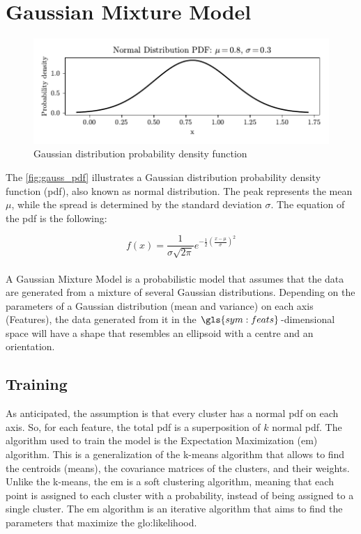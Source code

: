 \section{Gaussian Mixture Model}
\label{sec:gaussian}

\begin{figure}
    \centering
    \includegraphics{images/Gaussian/Figure_3.pdf}
    \caption{Gaussian distribution probability density function}
    \label{fig:gauss_pdf}
\end{figure}

The \autoref{fig:gauss_pdf} illustrates a Gaussian distribution probability density function (\gls{pdf}), also known as normal distribution. The peak represents the mean $\mu$, while the spread is determined by the standard deviation $\sigma$. The equation of the \gls{pdf} is the following:

$$
f(x) = \frac{1}{\sigma \sqrt{2\pi} } e^{-\frac{1}{2}\left(\frac{x-\mu}{\sigma}\right)^2}
$$

\paragraph*{}
A Gaussian Mixture Model is a probabilistic model that assumes that the data are generated from a mixture of several Gaussian distributions. Depending on the parameters of a Gaussian distribution (mean and variance) on each axis (Features), the data generated from it in the $\gls{sym:feats}$-dimensional space will have a shape that resembles an ellipsoid with a centre and an orientation.


\subsection{Training}
\label{sec:gauss_train}
As anticipated, the assumption is that every cluster has a normal \gls{pdf} on each axis. So, for each feature, the total \gls{pdf} is a superposition of $k$ normal \gls{pdf}. 
The algorithm used to train the model is the Expectation Maximization (\gls{em}) algorithm. This is a generalization of the k-means algorithm that allows to find the centroids (means), the covariance matrices of the clusters, and their weights. Unlike the k-means, the \gls{em} is a soft clustering algorithm, meaning that each point is assigned to each cluster with a probability, instead of being assigned to a single cluster.
The \gls{em} algorithm is an iterative algorithm that aims to find the parameters that maximize the \gls{glo:likelihood}.

